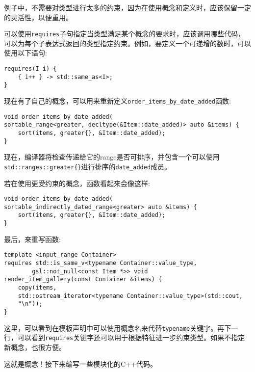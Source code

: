 例子中，不需要对类型进行太多的约束，因为在使用概念和定义时，应该保留一定的灵活性，以便重用。

可以使用\texttt{requires}子句指定当类型满足某个概念的要求时，应该调用哪些代码，可以为每个子表达式返回的类型指定约束。例如，要定义一个可递增的数时，可以使用以下语句:

\begin{lstlisting}[style=styleCXX]
requires(I i) {
	{ i++ } -> std::same_as<I>;
}
\end{lstlisting}

现在有了自己的概念，可以用来重新定义\texttt{order\_items\_by\_date\_added}函数:

\begin{lstlisting}[style=styleCXX]
void order_items_by_date_added(
sortable_range<greater, decltype(&Item::date_added)> auto &items) {
	sort(items, greater{}, &Item::date_added);
}
\end{lstlisting}

现在，编译器将检查传递给它的range是否可排序，并包含一个可以使用\texttt{std::ranges::greater\{\}}进行排序的\texttt{date\_added}成员。

若在使用更受约束的概念，函数看起来会像这样:

\begin{lstlisting}[style=styleCXX]
void order_items_by_date_added(
sortable_indirectly_dated_range<greater> auto &items) {
	sort(items, greater{}, &Item::date_added);
}
\end{lstlisting}

最后，来重写函数:

\begin{lstlisting}[style=styleCXX]
template <input_range Container>
requires std::is_same_v<typename Container::value_type,
		gsl::not_null<const Item *>> void
render_item_gallery(const Container &items) {
	copy(items,
	std::ostream_iterator<typename Container::value_type>(std::cout,
	"\n"));
}
\end{lstlisting}

这里，可以看到在模板声明中可以使用概念名来代替\texttt{typename}关键字。再下一行，可以看到\texttt{requires}关键字还可以用于根据特征进一步约束类型。如果不指定新概念，也很方便。

这就是概念！接下来编写一些模块化的C++代码。

